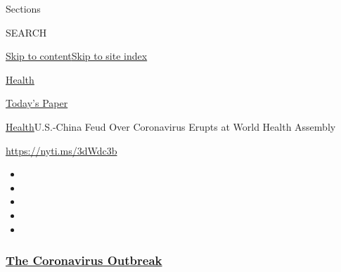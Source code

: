 Sections

SEARCH

\protect\hyperlink{site-content}{Skip to
content}\protect\hyperlink{site-index}{Skip to site index}

\href{https://www.nytimes3xbfgragh.onion/section/health}{Health}

\href{https://myaccount.nytimes3xbfgragh.onion/auth/login?response_type=cookie\&client_id=vi}{}

\href{https://www.nytimes3xbfgragh.onion/section/todayspaper}{Today's
Paper}

\href{/section/health}{Health}\textbar{}U.S.-China Feud Over Coronavirus
Erupts at World Health Assembly

\url{https://nyti.ms/3dWdc3b}

\begin{itemize}
\item
\item
\item
\item
\item
\end{itemize}

\hypertarget{the-coronavirus-outbreak}{%
\subsubsection{\texorpdfstring{\href{https://www.nytimes3xbfgragh.onion/news-event/coronavirus?name=styln-coronavirus-national\&region=TOP_BANNER\&block=storyline_menu_recirc\&action=click\&pgtype=Article\&impression_id=81b38e50-f4ce-11ea-be21-1dfd0b108786\&variant=undefined}{The
Coronavirus
Outbreak}}{The Coronavirus Outbreak}}\label{the-coronavirus-outbreak}}

